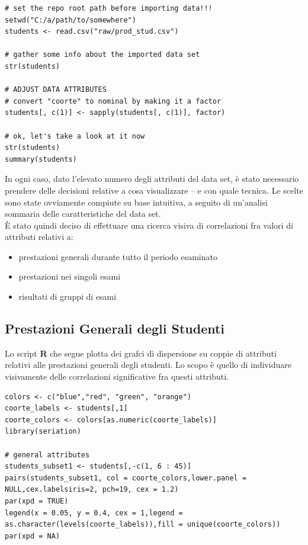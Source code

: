 \newpage

\begin{lstlisting}
# set the repo root path before importing data!!!
setwd("C:/a/path/to/somewhere")
students <- read.csv("raw/prod_stud.csv")

# gather some info about the imported data set
str(students)

# ADJUST DATA ATTRIBUTES 
# convert "coorte" to nominal by making it a factor 
students[, c(1)] <- sapply(students[, c(1)], factor)

# ok, let's take a look at it now
str(students)
summary(students)
\end{lstlisting}

In ogni caso, dato l’elevato numero degli attributi del data set, è stato necessario prendere delle decisioni relative a cosa visualizzare – e con quale tecnica. Le scelte sono state ovviamente compiute su base intuitiva, a seguito di un’analisi sommaria delle caratteristiche del data set. \\

È stato quindi deciso di effettuare una ricerca visiva di correlazioni fra valori di attributi relativi a:
\begin{itemize}
    \item prestazioni generali durante tutto il periodo esaminato
    \item prestazioni nei singoli esami
    \item risultati di gruppi di esami
\end{itemize}

\subsection{Prestazioni Generali degli Studenti}

Lo script \textbf{R} che segue plotta dei grafci di dispersione su coppie di attributi relativi alle prestazioni generali degli studenti. Lo scopo è quello di individuare visivamente delle correlazioni significative fra questi attributi.\\

\begin{lstlisting}
colors <- c("blue","red", "green", "orange")
coorte_labels <- students[,1]
coorte_colors <- colors[as.numeric(coorte_labels)]
library(seriation)

# general attributes
students_subset1 <- students[,-c(1, 6 : 45)]
pairs(students_subset1, col = coorte_colors,lower.panel = 	NULL,cex.labelsiris=2, pch=19, cex = 1.2)
par(xpd = TRUE)
legend(x = 0.05, y = 0.4, cex = 1,legend = 	as.character(levels(coorte_labels)),fill = unique(coorte_colors))
par(xpd = NA)
\end{lstlisting}

